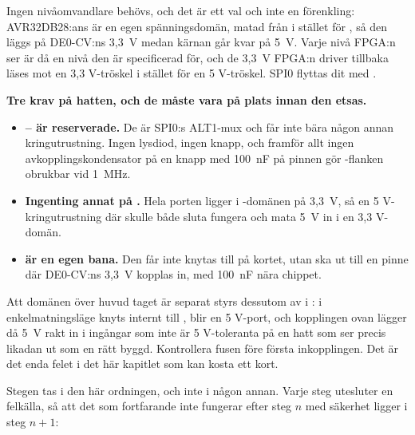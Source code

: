 Ingen nivåomvandlare behövs, och det är ett val och inte en förenkling: AVR32DB28:ans  är
en egen spänningsdomän, matad från  i stället för , så den läggs på DE0-CV:ns
3,3~V medan kärnan går kvar på 5~V. Varje nivå FPGA:n ser är då en nivå den är specificerad för, och
de 3,3~V FPGA:n driver tillbaka läses mot en 3,3 V-tröskel i stället för en 5 V-tröskel. SPI0 flyttas
dit med .

\begin{warning}
\textbf{Tre krav på hatten, och de måste vara på plats innan den etsas.}
\begin{itemize}
  \item \textbf{-- är reserverade.} De är SPI0:s ALT1-mux och får inte bära någon
    annan kringutrustning. Ingen lysdiod, ingen knapp, och framför allt ingen avkopplingskondensator
    på  \textemdash{} en knapp med 100~nF på pinnen gör -flanken obrukbar vid
    1~MHz.
  \item \textbf{Ingenting annat på .} Hela porten ligger i -domänen på
    3,3~V, så en 5 V-kringutrustning där skulle både sluta fungera och mata 5~V in i en 3,3 V-domän.
  \item \textbf{ är en egen bana.} Den får inte knytas till  på kortet, utan
    ska ut till en pinne där DE0-CV:ns 3,3~V kopplas in, med 100~nF nära chippet.
\end{itemize}

Att domänen över huvud taget är separat styrs dessutom av  i : i
enkelmatningsläge knyts  internt till ,  blir en 5 V-port, och
kopplingen ovan lägger då 5~V rakt in i ingångar som inte är 5 V-toleranta \textemdash{} på en hatt
som ser precis likadan ut som en rätt byggd. Kontrollera fusen före första inkopplingen. Det är det
enda felet i det här kapitlet som kan kosta ett kort.
\end{warning}

Stegen tas i den här ordningen, och inte i någon annan. Varje steg utesluter en felkälla, så att det
som fortfarande inte fungerar efter steg $n$ med säkerhet ligger i steg $n+1$:


